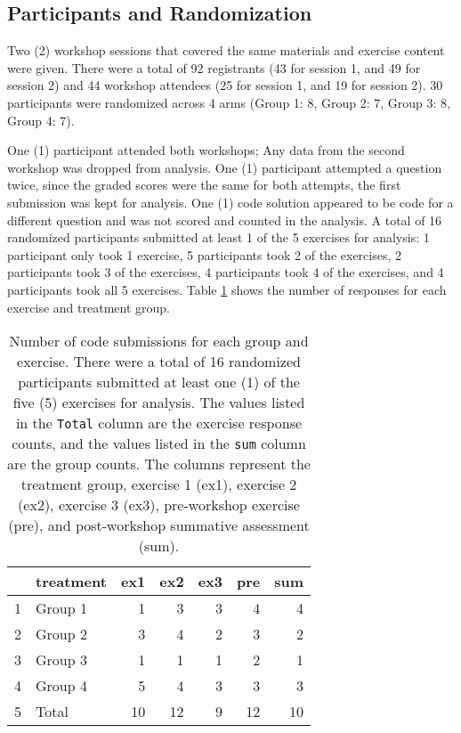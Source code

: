 \documentclass[acmsmall]{acmart}
\newcommand{\code}[1]{\lstinline{#1}}
\begin{document}
\subsection{Participants and Randomization}

Two (2) workshop sessions that covered the same materials and exercise content were given.
There were a total of 92 registrants (43 for session 1, and 49 for session 2)
and 44 workshop attendees (25 for session 1, and 19 for session 2).
30 participants were randomized across 4 arms
(Group 1: 8, Group 2: 7, Group 3: 8, Group 4: 7).

One (1) participant attended both workshops;
Any data from the second workshop was dropped from analysis.
One (1) participant attempted a question twice,
since the graded scores were the same for both attempts,
the first submission was kept for analysis.
One (1) code solution appeared to be code for a different question and was not scored and counted in the analysis.
A total of 16 randomized participants submitted at least 1 of the 5 exercises for analysis:
1 participant only took 1 exercise,
5 participants took 2 of the exercises,
2 participants took 3 of the exercises,
4 participants took 4 of the exercises, and
4 participants took all 5 exercises.
Table \ref{tab:exercise-treatment-response-counts} shows the number of
responses for each exercise and treatment group.

\begin{table}[ht]
	\centering
	\caption[Number of responses by group and exercise]
	{Number of code submissions for each group and exercise.
		There were a total of 16 randomized participants submitted at least one (1) of the five (5) exercises for analysis.
		The values listed in the \code{Total} column are the exercise response counts,
		and the values listed in the \code{sum} column are the group counts.
		The columns represent the
		treatment group,
		exercise 1 (ex1), exercise 2 (ex2), exercise 3 (ex3),
		pre-workshop exercise (pre), and
		post-workshop summative assessment (sum).
	}
	\begin{tabular}{rlrrrrr}
		\hline
		& treatment & ex1 & ex2 & ex3 & pre & sum \\
		\hline
		1 & Group 1 &   1 &   3 &   3 &   4 &   4 \\
		2 & Group 2 &   3 &   4 &   2 &   3 &   2 \\
		3 & Group 3 &   1 &   1 &   1 &   2 &   1 \\
		4 & Group 4 &   5 &   4 &   3 &   3 &   3 \\
		5 & Total &  10 &  12 &   9 &  12 &  10 \\
		\hline
	\end{tabular}
	\label{tab:exercise-treatment-response-counts}
\end{table}
\end{document}
